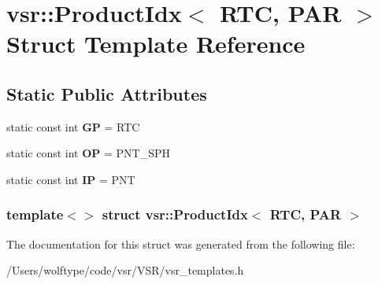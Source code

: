 \hypertarget{structvsr_1_1_product_idx_3_01_r_t_c_00_01_p_a_r_01_4}{\section{vsr\-:\-:Product\-Idx$<$ R\-T\-C, P\-A\-R $>$ Struct Template Reference}
\label{structvsr_1_1_product_idx_3_01_r_t_c_00_01_p_a_r_01_4}
}
\subsection*{Static Public Attributes}
\begin{DoxyCompactItemize}
\item 
\hypertarget{structvsr_1_1_product_idx_3_01_r_t_c_00_01_p_a_r_01_4_a51d3992455569ba756606de242143333}{static const int {\bfseries G\-P} = R\-T\-C}\label{structvsr_1_1_product_idx_3_01_r_t_c_00_01_p_a_r_01_4_a51d3992455569ba756606de242143333}

\item 
\hypertarget{structvsr_1_1_product_idx_3_01_r_t_c_00_01_p_a_r_01_4_a39539c924729e902a1c83bfdd184eebc}{static const int {\bfseries O\-P} = P\-N\-T\-\_\-\-S\-P\-H}\label{structvsr_1_1_product_idx_3_01_r_t_c_00_01_p_a_r_01_4_a39539c924729e902a1c83bfdd184eebc}

\item 
\hypertarget{structvsr_1_1_product_idx_3_01_r_t_c_00_01_p_a_r_01_4_aec9f153d582928ad7a9fd9656be0bb81}{static const int {\bfseries I\-P} = P\-N\-T}\label{structvsr_1_1_product_idx_3_01_r_t_c_00_01_p_a_r_01_4_aec9f153d582928ad7a9fd9656be0bb81}

\end{DoxyCompactItemize}
\subsubsection*{template$<$$>$ struct vsr\-::\-Product\-Idx$<$ R\-T\-C, P\-A\-R $>$}



The documentation for this struct was generated from the following file\-:\begin{DoxyCompactItemize}
\item 
/\-Users/wolftype/code/vsr/\-V\-S\-R/vsr\-\_\-templates.\-h\end{DoxyCompactItemize}
